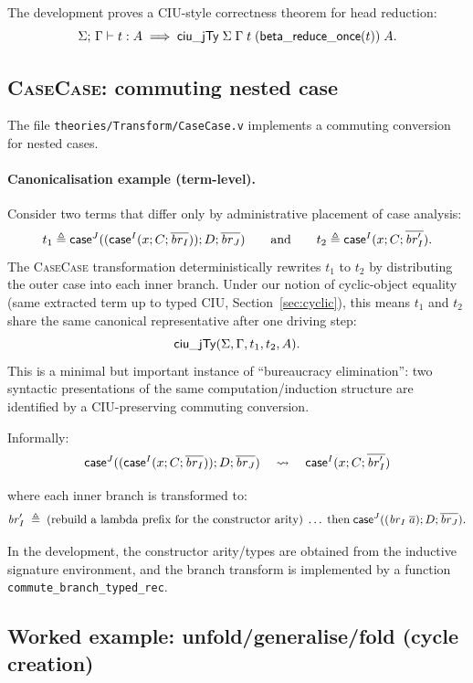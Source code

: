 The development proves a CIU-style correctness theorem for head reduction:
\[
\Sigma;\,\Gamma \vdash t : A \implies \mathsf{ciu\_jTy}\;\Sigma\;\Gamma\;t\;(\mathsf{beta\_reduce\_once}(t))\;A.
\]

\subsection{\textsc{CaseCase}: commuting nested case}

The file \texttt{theories/Transform/CaseCase.v} implements a commuting conversion for nested cases.

\paragraph{Canonicalisation example (term-level).}
Consider two terms that differ only by administrative placement of case analysis:
\[
  t_1 \triangleq \mathsf{case}^{J}((\mathsf{case}^{I}(x;C;\overline{\mathit{br}_I}));D;\overline{\mathit{br}_J})
  \qquad\text{and}\qquad
  t_2 \triangleq \mathsf{case}^{I}(x;C;\overline{\mathit{br}'_I}).
\]
The \textsc{CaseCase} transformation deterministically rewrites \(t_1\) to \(t_2\) by distributing the outer case into each inner branch.
Under our notion of cyclic-object equality (same extracted term up to typed CIU, Section~\ref{sec:cyclic}), this means \(t_1\) and \(t_2\) share the same canonical representative after one driving step:
\[
  \mathsf{ciu\_jTy}(\Sigma,\Gamma,t_1,t_2,A).
\]
This is a minimal but important instance of ``bureaucracy elimination'': two syntactic presentations of the same computation/induction structure are identified by a CIU-preserving commuting conversion.

Informally:
\[
\mathsf{case}^{J}((\mathsf{case}^{I}(x;C;\overline{\mathit{br}_I}));D;\overline{\mathit{br}_J})
\quad\leadsto\quad
\mathsf{case}^{I}(x;C;\overline{\mathit{br}'_I})
\]

where each inner branch is transformed to:
\[
\mathit{br}'_I \;\triangleq\; \text{(rebuild a lambda prefix for the constructor arity)}\;\ldots\;\text{then}\;\mathsf{case}^{J}((\mathit{br}_I\;\overline{a});D;\overline{\mathit{br}_J}).
\]

In the development, the constructor arity/types are obtained from the inductive signature environment, and the branch transform is implemented by a function \texttt{commute\_branch\_typed\_rec}.

\subsection{Worked example: unfold/generalise/fold (cycle creation)}

